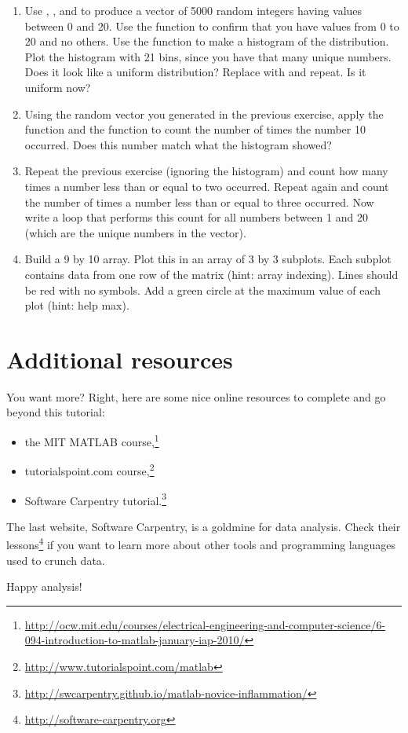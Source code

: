 \documentclass{article}
\begin{document}
\begin{enumerate}

\item Use , , and \mcode{*} to produce a vector of 5000 random integers having values between 0 and 20.
  Use the  function to confirm that you have values from 0 to 20 and no others.
  Use the  function to make a histogram of the distribution.
  Plot the histogram with 21 bins, since you have that many unique numbers.
  Does it look like a uniform distribution? Replace  with  and repeat.
  Is it uniform now?
\item Using the random vector you generated in the previous exercise, apply the  function and the  function to count the number of times the number 10 occurred.
  Does this number match what the histogram showed?
\item Repeat the previous exercise (ignoring the histogram) and count how many times a number less than or equal to two occurred.
  Repeat again and count the number of times a number less than or equal to three occurred.
  Now write a  loop that performs this count for all numbers between 1 and 20 (which are the unique numbers in the vector).
\item Build a 9 by 10 array. Plot this in an array of 3 by 3 subplots.
  Each subplot contains data from one row of the matrix (hint: array indexing).
  Lines should be red with no symbols.
  Add a green circle at the maximum value of each plot (hint: help max).

\end{enumerate}


\section{Additional resources}

You want more?
Right, here are some nice online resources to complete and go beyond this tutorial:
\begin{itemize}
  \item the MIT MATLAB course,\footnote{%
    \url{http://ocw.mit.edu/courses/electrical-engineering-and-computer-science/6-094-introduction-to-matlab-january-iap-2010/}
  }
  \item tutorialspoint.com course,\footnote{%
    \url{http://www.tutorialspoint.com/matlab}
  }
  \item Software Carpentry tutorial.\footnote{%
    \url{http://swcarpentry.github.io/matlab-novice-inflammation/}
  }
\end{itemize}

The last website, Software Carpentry, is a goldmine for data analysis.
Check their lessons\footnote{\url{http://software-carpentry.org}} if you want to learn more about other tools and programming languages used to crunch data.

Happy analysis!
\end{document}
